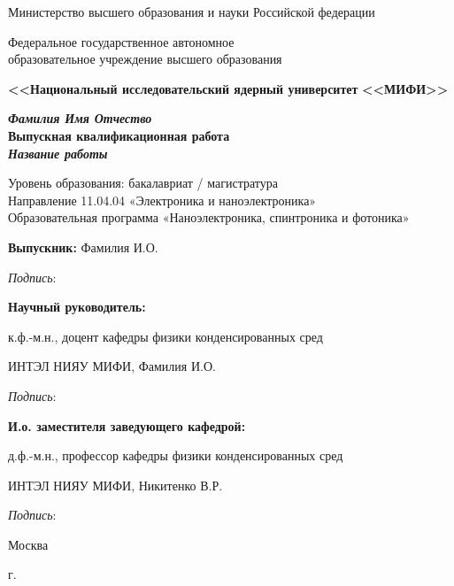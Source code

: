 \begin{titlepage}
\begin{center}
Министерство высшего образования и науки Российской федерации

Федеральное государственное автономное \\образовательное учреждение высшего образования

\textbf{<<Национальный исследовательский ядерный университет}
\textbf{<<МИФИ>>}

\vspace{25mm}

\textbf{\textit{\large Фамилия Имя Отчество}} \\[8mm]
\textbf{\large Выпускная квалификационная работа}\\[3mm]
\textbf{\textit{\large Название работы}}

\vspace{10mm}
Уровень образования: бакалавриат / магистратура\\
Направление 11.04.04 «Электроника и наноэлектроника»\\
Образовательная программа
«Наноэлектроника, спинтроника и фотоника»

\vspace{15mm}

\begin{flushleft}
\textbf{Выпускник:} Фамилия И.О.

\hspace{10cm} \textit{Подпись}: \space \hrulefill

\textbf{Научный руководитель:} 

к.ф.-м.н., доцент кафедры физики конденсированных сред

ИНТЭЛ НИЯУ МИФИ, Фамилия И.О.

\hspace{10cm} \textit{Подпись}: \space \hrulefill

\textbf{И.о. заместителя заведующего кафедрой:} 

д.ф.-м.н., профессор кафедры физики конденсированных сред 

ИНТЭЛ НИЯУ МИФИ, Никитенко В.Р.

\hspace{10cm} \textit{Подпись}: \space \hrulefill \space
\end{flushleft}

\vfill 

{Москва}
\par{\the\year{} г.}
\end{center}
\end{titlepage}
\restoregeometry
\addtocounter{page}{1}
